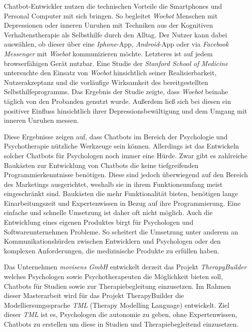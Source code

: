 Chatbot-Entwickler nutzen die technischen Vorteile die Smartphones und Personal Computer mit sich bringen. So begleitet \emph{Woebot} Menschen mit Depressionen oder inneren Unruhen mit Techniken aus der Kognitiven Verhaltenstherapie als Selbsthilfe durch den Alltag. Der Nutzer kann dabei auswählen, ob dieser über eine \emph{Iphone}-App, \emph{Android}-App oder via \emph{Facebook Messenger} mit \emph{Woebot} kommunizieren möchte. Letzteres ist auf jedem browserfähigen Gerät nutzbar. Eine Studie der \emph{Stanford School of Medicine} untersuchte den Einsatz von \emph{Woebot} hinsichtlich seiner Realisierbarkeit, Nutzerakzeptanz und die vorläufige Wirksamkeit des bereitgestellten Selbsthilfeprogramms. Das Ergebnis der Studie zeigte, dass \emph{Woebot} beinahe täglich von den Probanden genutzt wurde. Außerdem ließ sich bei diesen ein positiver Einfluss hinsichtlich ihrer Depressionsbewältigung und dem Umgang mit inneren Unruhen messen.


Diese Ergebnisse zeigen auf, dass Chatbots im Bereich der Psychologie und Psychotherapie nützliche Werkzeuge sein können. Allerdings ist das Entwickeln solcher Chatbots für Psychologen noch immer eine Hürde. Zwar gibt es zahlreiche Baukästen zur Entwicklung von Chatbots die keine tiefgreifenden Programmierkenntnisse benötigen. Diese sind jedoch überwiegend auf den Bereich des Marketings ausgerichtet, weshalb sie in ihrem Funktionsumfang meist eingeschränkt sind. Baukästen die mehr Funktionalität bieten, benötigen lange Einarbeitungszeit und Expertenwissen in Bezug auf ihre Programmierung. Eine einfache und schnelle Umsetzung ist daher oft nicht möglich. Auch die Entwicklung eines eigenen Produktes birgt für Psychologen und Softwareunternehmen Probleme. So scheitert die Umsetzung unter anderem an Kommunikationshürden zwischen Entwicklern und Psychologen oder den komplexen Anforderungen, die medizinische Produkte zu erfüllen haben. 

Das Unternehmen \emph{movisens GmbH} entwickelt derzeit das Projekt \emph{TherapyBuilder} welches Psychologen sowie Psychotherapeuten die Möglichkeit bieten soll, Chatbots  für Studien sowie zur Therapiebegleitung einzusetzen. Im Rahmen dieser Masterarbeit wird für das Projekt TherapyBuilder die Modelliersungssprache \emph{TML} (Therapy Modelling Language) entwickelt. Ziel dieser \emph{TML} ist es, Psychologen die autonomie zu geben, ohne Expertenwissen, Chatbots zu erstellen um diese in Studien und Therapiebegleitend einzusetzen.

